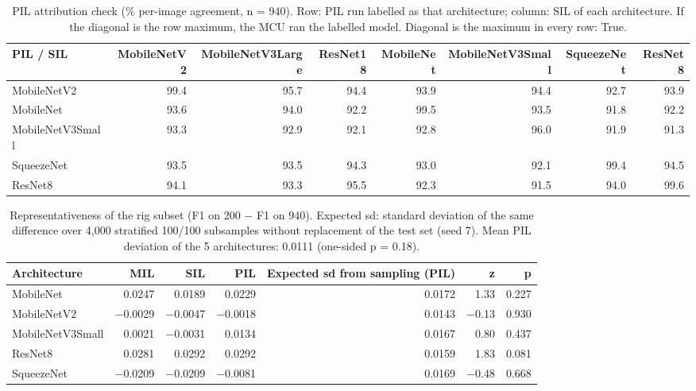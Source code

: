 \begin{table}[htbp]
\centering
\scriptsize
\caption{PIL attribution check (\% per-image agreement, n = 940). Row: PIL run labelled as that architecture; column: SIL of each architecture. If the diagonal is the row maximum, the MCU ran the labelled model. Diagonal is the maximum in every row: True.}
\label{tab:ladder7}
\begin{tabular}{lrrrrrrr}
\toprule
PIL / SIL & MobileNetV2 & MobileNetV3Large & ResNet18 & MobileNet & MobileNetV3Small & SqueezeNet & ResNet8 \\
\midrule
MobileNetV2 & 99.4 & 95.7 & 94.4 & 93.9 & 94.4 & 92.7 & 93.9 \\
MobileNet & 93.6 & 94.0 & 92.2 & 99.5 & 93.5 & 91.8 & 92.2 \\
MobileNetV3Small & 93.3 & 92.9 & 92.1 & 92.8 & 96.0 & 91.9 & 91.3 \\
SqueezeNet & 93.5 & 93.5 & 94.3 & 93.0 & 92.1 & 99.4 & 94.5 \\
ResNet8 & 94.1 & 93.3 & 95.5 & 92.3 & 91.5 & 94.0 & 99.6 \\
\bottomrule
\end{tabular}
\end{table}

\begin{table}[htbp]
\centering
\scriptsize
\caption{Representativeness of the rig subset (F1 on 200 $-$ F1 on 940). Expected sd: standard deviation of the same difference over 4,000 stratified 100/100 subsamples without replacement of the test set (seed 7). Mean PIL deviation of the 5 architectures: 0.0111 (one-sided p = 0.18).}
\label{tab:ladder8}
\begin{tabular}{lrrrrrr}
\toprule
Architecture & MIL & SIL & PIL & Expected sd from sampling (PIL) & z & p \\
\midrule
MobileNet & 0.0247 & 0.0189 & 0.0229 & 0.0172 & 1.33 & 0.227 \\
MobileNetV2 & $-$0.0029 & $-$0.0047 & $-$0.0018 & 0.0143 & $-$0.13 & 0.930 \\
MobileNetV3Small & 0.0021 & $-$0.0031 & 0.0134 & 0.0167 & 0.80 & 0.437 \\
ResNet8 & 0.0281 & 0.0292 & 0.0292 & 0.0159 & 1.83 & 0.081 \\
SqueezeNet & $-$0.0209 & $-$0.0209 & $-$0.0081 & 0.0169 & $-$0.48 & 0.668 \\
\bottomrule
\end{tabular}
\end{table}
